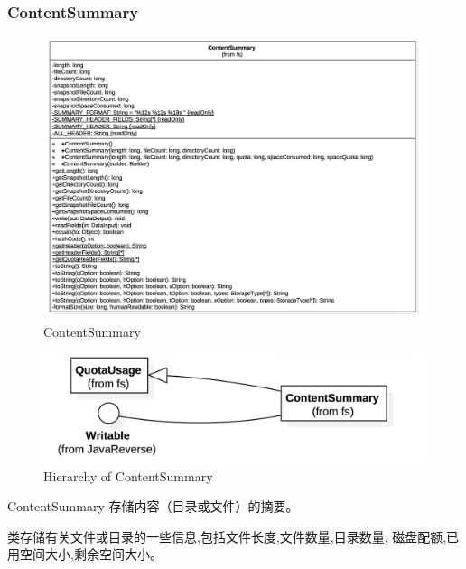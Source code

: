 \subsubsection{ContentSummary}

\begin{figure}
\centering
\includegraphics[width =1\linewidth]{uml/outputstream/9.png}
\caption{ContentSummary}
\label{fig:ContentSummary}
\end{figure}

\begin{figure}
\centering
\includegraphics[width =1\linewidth]{uml/outputstream/10.png}
\caption{Hierarchy of ContentSummary}
\label{fig:Hierarchy of ContentSummary}
\end{figure}

ContentSummary 存储内容（目录或文件）的摘要。

类存储有关文件或目录的一些信息,包括文件长度,文件数量,目录数量,
磁盘配额,已用空间大小,剩余空间大小。

